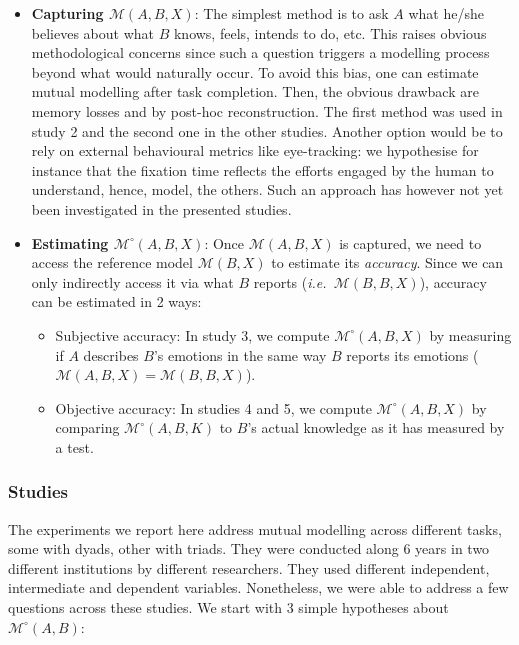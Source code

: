 \documentclass[natbib]{svjour3}
\newcommand{\ie}{{\textit{i.e.\ }}}
\newcommand{\M}[3]{{\mathcal{M}(#1, #2, #3)}}
\newcommand{\model}[3]{{$\mathcal{M}(#1, #2, #3)$}}
\newcommand{\refmodel}[2]{{$\mathcal{M}(#1, #2)$}}
\newcommand{\Model}[3]{{$\mathcal{M}^{\circ}(#1, #2, #3)$}}
\begin{document}
\begin{itemize}
    \item {\bf Capturing \model{A}{B}{X}}: The simplest method is to ask $A$
        what he/she believes about what $B$ knows, feels, intends to do, etc.
        This raises obvious methodological concerns since such a question
        triggers a modelling process beyond what would naturally occur. To avoid
        this bias, one can estimate mutual modelling after task completion.
        Then, the obvious drawback are memory losses and by post-hoc
        reconstruction.  The first method was used in study 2 and the second one
        in the other studies. Another option would be to rely on external
        behavioural metrics like eye-tracking: we hypothesise for instance that
        the fixation time reflects the efforts engaged by the human to
        understand, hence, model, the others. Such an approach has however not
        yet been investigated in the presented studies.

    \item {\bf Estimating \Model{A}{B}{X}}: Once \model{A}{B}{X} is captured, we
        need to access the reference model \refmodel{B}{X} to estimate its
        \emph{accuracy}. Since we can only indirectly access it via what $B$
        reports (\ie \model{B}{B}{X}), accuracy can be estimated in 2 ways:

        \begin{itemize}

            \item Subjective accuracy: In study 3, we compute
                \Model{A}{B}{X} by measuring if $A$ describes
                $B$'s emotions in the same way $B$ reports its emotions 
                ($\M{A}{B}{X} = \M{B}{B}{X}$).

            \item Objective accuracy: In studies 4 and 5, we compute
                \Model{A}{B}{X} by comparing \Model{A}{B}{K} to $B$'s
                actual knowledge as it has measured by a test.

        \end{itemize}

\end{itemize}


\subsubsection*{Studies}

The experiments we report here address mutual modelling across different tasks,
some with dyads, other with triads. They were conducted along 6 years in two
different institutions by different researchers. They used different
independent, intermediate and dependent variables. Nonetheless, we were able to
address a few questions across these studies. We start with 3 simple hypotheses
about $\mathcal{M}^{\circ}(A,B)$:
\end{document}
